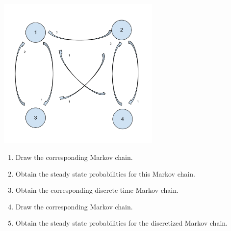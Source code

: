 \documentclass[12pt]{article}
\begin{document}
\begin{enumerate}
\begin{center}
\includegraphics[width=8cm]{Markov_Chains_Ex_5.pdf}
\end{center}

\begin{enumerate}
	\item Draw the corresponding Markov chain.
	\item Obtain the steady state probabilities for this Markov chain.
	\item Obtain the corresponding discrete time Markov chain.
	\item Draw the corresponding Markov chain.
	\item Obtain the steady state probabilities for the discretized Markov chain.
\end{enumerate}

\end{enumerate}
\end{document}
